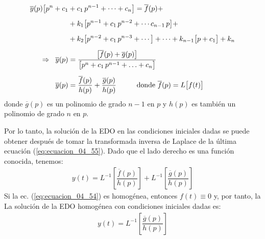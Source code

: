 \begin{align}
\begin{aligned}[b]
\overline{y}(p) \big[  p^{n} + c_{1} &+ c_{1} \, p^{n-1} + \cdots + c_{n}  \big] = \overline{f}(p) + \\[0.5em]
&+ k_{1} \big[  p^{n-1} + c_{1} \, p^{n-2} + \cdots c_{n-1} \, p  \big] + \\[0.5em]
&+ k_{2} \big[  p^{n-2} + c_{1} \, p^{n-3} + \cdots  \big] + \cdots + k_{n-1} \big[  p + c_{1}  \big] + k_{n} \\[0.5em]
\Rightarrow \hspace{0.2cm} \overline{y}(p) &= \dfrac{\big[ \overline{f}(p) + \overline{g}(p)  \big]}{\big[ p^{n}+ c_{1} \, p^{n-1} + \ldots + c_{n} \big]} \\[0.5em]
\overline{y}(p) &= \dfrac{\overline{f}(p)}{h(p)} + \dfrac{\overline{g}(p)}{h(p)} \hspace{1cm} \mbox{donde } \overline{f} (p) = L \big[  f (t)  \big]
\end{aligned}
\label{eq:ecuacion_04_55}
\end{align}
donde $\overline{g}(p)$ es un polinomio de grado $n-1$ en $p$ y $h(p)$ es también un polinomio de grado $n$ en $p$.
\par
Por lo tanto, la solución de la EDO en las condiciones iniciales dadas se puede obtener después de tomar la transformada inversa de Laplace de la última ecuación (\ref{eq:ecuacion_04_55}). Dado que el lado derecho es una función conocida, tenemos:
\begin{align}
y(t) = L^{-1} \left[ \dfrac{\overline{f}(p)}{h(p)} \right] + L^{-1} \left[ \dfrac{\overline{g}(p)}{h(p)} \right]
\label{eq:ecuacion_04_56}
\end{align}
Si la ec. (\ref{eq:ecuacion_04_54}) es homogénea, entonces $f (t) \equiv 0$ y, por tanto, la La solución de la EDO homogénea con condiciones iniciales dadas es:
\begin{align}
y(t) = L^{-1} \left[ \dfrac{\overline{g}(p)}{h(p)} \right]
\label{eq:ecuacion_04_57}
\end{align}

